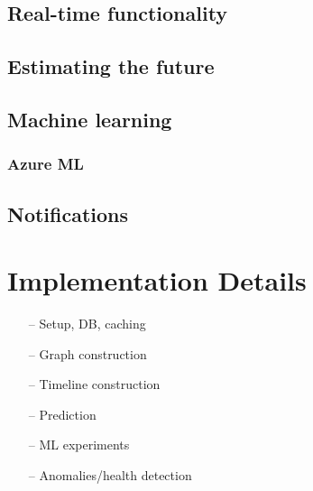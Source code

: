 \documentclass[english,12pt,a4paper,pdftex,sci,utf8]{aaltothesis}
\begin{document}
\subsection{Real-time functionality}

\subsection{Estimating the future}

\subsection{Machine learning}



\subsubsection{Azure ML}

\subsection{Notifications}



\clearpage
\section{Implementation Details}

\begin{itemize}
\item[--]Setup, DB, caching
\item[--]Graph construction
\item[--]Timeline construction
\item[--]Prediction
\item[--]ML experiments
\item[--]Anomalies/health detection
\end{itemize}
\end{document}

